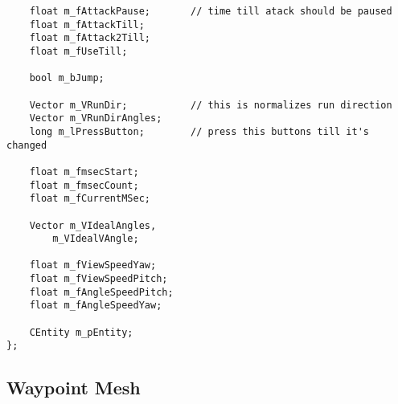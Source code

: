 \documentclass[12pt]{article}
\begin{document}
\begin{verbatim}
    float m_fAttackPause;       // time till atack should be paused
    float m_fAttackTill;
    float m_fAttack2Till;
    float m_fUseTill;

    bool m_bJump;

    Vector m_VRunDir;           // this is normalizes run direction
    Vector m_VRunDirAngles;
    long m_lPressButton;        // press this buttons till it's changed

    float m_fmsecStart;
    float m_fmsecCount;
    float m_fCurrentMSec;

    Vector m_VIdealAngles,
        m_VIdealVAngle;

    float m_fViewSpeedYaw;
    float m_fViewSpeedPitch;
    float m_fAngleSpeedPitch;
    float m_fAngleSpeedYaw;

    CEntity m_pEntity;
};
\end{verbatim}
\linespread{1.3}
\normalsize

\subsection{Waypoint Mesh}
\end{document}
